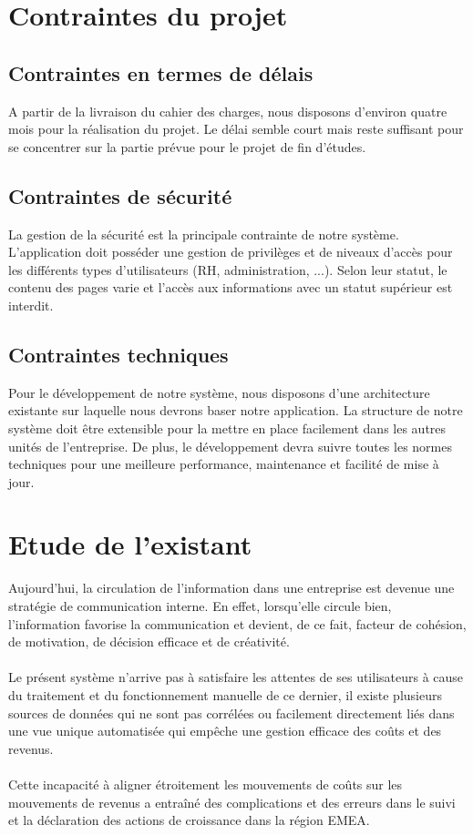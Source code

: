 \section{Contraintes du projet}

\subsection{Contraintes en termes de délais}
A partir de la livraison du cahier des charges, nous disposons d’environ quatre mois pour la réalisation du projet. Le délai semble court mais reste suffisant pour se concentrer sur la partie prévue pour le projet de fin d’études.

\subsection{Contraintes de sécurité}
La gestion de la sécurité est la principale contrainte de notre système. L'application doit posséder une gestion de privilèges et de niveaux d'accès pour les différents types d'utilisateurs (RH, administration, ...). Selon leur statut, le contenu des pages varie et l'accès aux informations avec un statut supérieur est interdit.

\subsection{Contraintes techniques}

Pour le développement de notre système, nous disposons d’une architecture
existante sur laquelle nous devrons baser notre application. La structure de notre système doit être extensible pour la mettre en place facilement dans les autres unités de l’entreprise. De plus, le développement devra suivre toutes les normes techniques pour une meilleure performance, maintenance et facilité de mise à jour.

\section{Etude de l'existant}

Aujourd’hui, la circulation de l’information dans une entreprise est devenue une stratégie de communication interne. En effet, lorsqu’elle circule bien, l’information favorise la communication et devient, de ce fait, facteur de cohésion, de motivation, de décision efficace et de créativité.
\\\\
Le présent système n’arrive pas à satisfaire les attentes de ses utilisateurs à cause du traitement et du fonctionnement manuelle de ce dernier, il existe plusieurs sources de données qui ne sont pas corrélées ou facilement directement liés dans une vue unique automatisée qui empêche une gestion efficace des coûts et des revenus.
\\\\
Cette incapacité à aligner étroitement les mouvements de coûts sur les mouvements de revenus a entraîné des complications et des erreurs dans le suivi et la déclaration des actions de croissance dans la région EMEA.
\\

